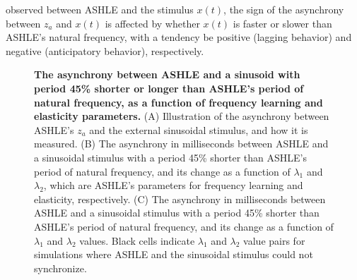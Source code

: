 \documentclass[10pt,letterpaper]{article}
\begin{document}
observed between ASHLE and the stimulus $x(t)$, the sign of the asynchrony between $z_a$ and $x(t)$ is affected by whether $x(t)$ is faster or slower than ASHLE's natural frequency, with a tendency be positive (lagging behavior) and negative (anticipatory behavior), respectively.

\begin{figure}[!h]
\caption{{\bf The asynchrony between ASHLE and a sinusoid with period 45\% shorter or longer than ASHLE's period of natural frequency, as a function of frequency learning and elasticity parameters.} (A) Illustration of the asynchrony between ASHLE's $z_a$ and the external sinusoidal stimulus, and how it is measured. (B) The asynchrony in milliseconds between ASHLE and a sinusoidal stimulus with a period 45\% shorter than ASHLE's period of natural frequency, and its change as a function of $\lambda_1$ and $\lambda_2$, which are ASHLE's parameters for frequency learning and elasticity, respectively. (C) The asynchrony in milliseconds between ASHLE and a sinusoidal stimulus with a period 45\% shorter than ASHLE's period of natural frequency, and its change as a function of $\lambda_1$ and $\lambda_2$ values. Black cells indicate $\lambda_1$ and $\lambda_2$ value pairs for simulations where ASHLE and the sinusoidal stimulus could not synchronize.}
\label{fig6}
\end{figure}
\end{document}
